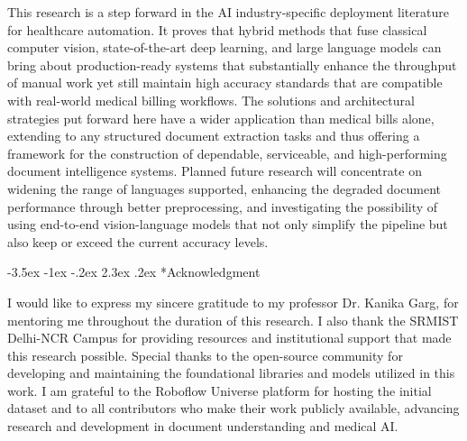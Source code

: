 \documentclass[conference,twocolumn]{IEEEtran}
\makeatletter
\renewcommand{\section}{\@startsection{section}{1}{\z@}%
  {-3.5ex \@plus -1ex \@minus -.2ex}%
  {2.3ex \@plus.2ex}%
  {\normalfont\large\bfseries\centering}}
\makeatother
\begin{document}
This research is a step forward in the AI industry-specific deployment
literature for healthcare automation. It proves that hybrid methods that
fuse classical computer vision, state-of-the-art deep learning, and
large language models can bring about production-ready systems that
substantially enhance the throughput of manual work yet still maintain
high accuracy standards that are compatible with real-world medical
billing workflows. The solutions and architectural strategies put
forward here have a wider application than medical bills alone,
extending to any structured document extraction tasks and thus offering
a framework for the construction of dependable, serviceable, and
high-performing document intelligence systems. Planned future research
will concentrate on widening the range of languages supported, enhancing
the degraded document performance through better preprocessing, and
investigating the possibility of using end-to-end vision-language models
that not only simplify the pipeline but also keep or exceed the current accuracy levels.

\section*{Acknowledgment}

  I would like to express my sincere gratitude to my professor Dr. Kanika
Garg, for mentoring me throughout the duration of this research. I also
thank the SRMIST Delhi-NCR Campus for providing resources and
institutional support that made this research possible. Special thanks
to the open-source community for developing and maintaining the
foundational libraries and models utilized in this work. I am grateful
to the Roboflow Universe platform for hosting the initial dataset and to
all contributors who make their work publicly available, advancing
research and development in document understanding and medical AI.
\end{document}
